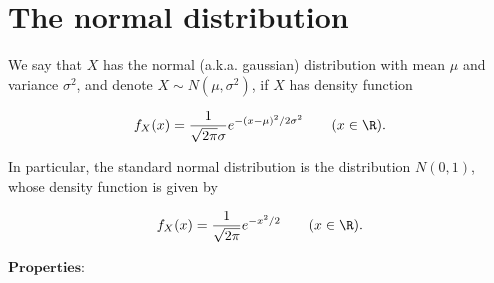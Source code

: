 \section{The normal distribution}
\label{sec:normal-dist}

We say that $X$ has the normal (a.k.a. gaussian)
distribution with mean $\mu$ and variance $\sigma^2$,
and denote $X\sim N(\mu,\sigma^2)$, if $X$ has
density function

\[
f_X(x) = \frac{1}{\sqrt{2\pi} \sigma} e^{-(x-\mu)^2/2\sigma^2} \qquad (x\in\R).
\]

\noindent In particular, the standard normal distribution is
the distribution $N(0,1)$, whose density function is
given by

\[
f_X(x) = \frac{1}{\sqrt{2\pi}} e^{-x^2/2} \qquad (x\in\R).
\]

\noindent $\textbf{Properties:}$

